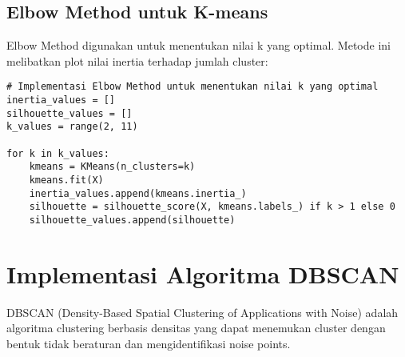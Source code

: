 \documentclass[a4paper,12pt]{article}
\begin{document}
\subsection{Elbow Method untuk K-means}
Elbow Method digunakan untuk menentukan nilai k yang optimal. Metode ini melibatkan plot nilai inertia terhadap jumlah cluster:
\begin{lstlisting}
# Implementasi Elbow Method untuk menentukan nilai k yang optimal
inertia_values = []
silhouette_values = []
k_values = range(2, 11)

for k in k_values:
    kmeans = KMeans(n_clusters=k)
    kmeans.fit(X)
    inertia_values.append(kmeans.inertia_)
    silhouette = silhouette_score(X, kmeans.labels_) if k > 1 else 0
    silhouette_values.append(silhouette)
\end{lstlisting}

\section{Implementasi Algoritma DBSCAN}
DBSCAN (Density-Based Spatial Clustering of Applications with Noise) adalah algoritma clustering berbasis densitas yang dapat menemukan cluster dengan bentuk tidak beraturan dan mengidentifikasi noise points.
\end{document}
